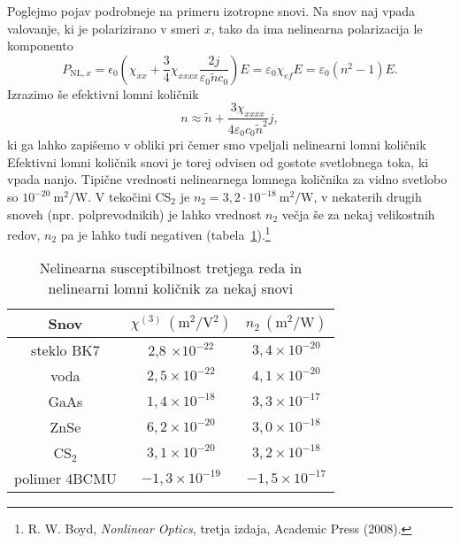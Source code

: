 Poglejmo pojav podrobneje na primeru izotropne snovi. Na snov naj vpada valovanje, ki je polarizirano
v smeri $x$, tako da ima nelinearna polarizacija le komponento 
\begin{equation}
P_{\mathrm{NL},x}=
\epsilon_{0} \left(\chi_{xx} +\frac{3}{4} \chi_{xxxx}\frac{2 j }
{\varepsilon_0 \tilde{n} c_0}\right)E = \varepsilon_0 \chi_{ef}E = \varepsilon_0 (n^2-1) E.
\end{equation}
Izrazimo še efektivni lomni količnik
\begin{equation}
n \approx \tilde{n} + \frac{3 \chi_{xxxx}}{4 \varepsilon_0 c_0 \tilde{n}^2} j,
\end{equation}
ki ga lahko zapišemo v obliki 
pri čemer smo vpeljali nelinearni lomni količnik
Efektivni lomni količnik snovi je torej odvisen od gostote svetlobnega toka, ki vpada nanjo. 
Tipične vrednosti nelinearnega lomnega količnika za vidno svetlobo so $10^{-20}~\si{\metre^2/\watt}$.
V tekočini CS$_2$ je $n_2 = 3,2 \cdot 10^{-18}~\si{\metre^2/\watt}$, v nekaterih 
drugih snoveh (npr. polprevodnikih) je lahko vrednost $n_2$ večja še za nekaj 
velikostnih redov, $n_2$ pa je lahko tudi negativen (tabela~\ref{table:chi3}).\footnote{R.
W. Boyd, {\it Nonlinear Optics}, tretja izdaja, Academic Press (2008).}

\begin{table}[h]
 \centering
\begin{tabular}{|c|c|c|} \hline  
      Snov & $\chi^{(3)}~(\si{\metre^2/\volt^2})$ & $n_2~(\si{\metre^2/\watt})$\\ \hline
     steklo BK7 & 2,8 $\times 10^{-22}$ & $3,4 \times 10^{-20}$ \\ \hline
     voda & $2,5 \times 10^{-22}$ & $4,1 \times 10^{-20}$ \\ \hline
     GaAs & $1,4 \times 10^{-18}$ & $3,3 \times 10^{-17}$ \\ \hline\index{GaAs}
     ZnSe & $6,2 \times 10^{-20}$ & $3,0 \times 10^{-18}$ \\ \hline\index{ZnSe}
     CS$_2$ & $3,1 \times 10^{-20}$ & $3,2 \times 10^{-18}$ \\ \hline \index{CS$_2$}
     polimer 4BCMU  & $-1,3 \times 10^{-19}$ & $-1,5 \times 10^{-17}$ \\ \hline      
\end{tabular}
  \caption{Nelinearna susceptibilnost tretjega reda in nelinearni lomni količnik za nekaj snovi}
\label{table:chi3}
\end{table}

